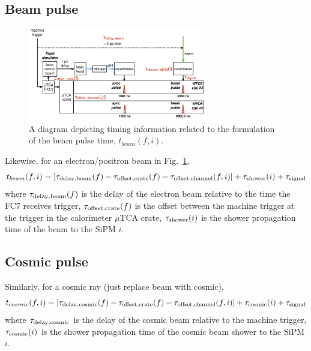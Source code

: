 \subsection{Beam pulse}

\begin{figure}[htbp]
\centering
\includegraphics[width=0.7\textwidth]{pics/BeamTimeFormulation.pdf} 
\caption{A diagram depicting timing information related to the formulation of the beam pulse time, $t_{beam}(f,i)$.}\label{fig:BeamTime}
\end{figure}

Likewise, for an electron/positron beam in Fig.~\ref{fig:BeamTime},
%
\begin{equation}
t_{beam}(f,i) = [\tau_{\rm{delay,beam}}(f) - \tau_{\rm{offset,crate}}(f) - \tau_{\rm{offset,channel}}(f,i) ]  + \tau_{\rm{shower}}(i) + \tau_{\rm{signal}} \label{eq:tbeam}
\end{equation}
%
where $\tau_{\rm{delay,beam}}(f)$ is the delay of the electron beam relative to the time the FC7 receives trigger, $\tau_{\rm{offset,crate}}(f)$ is the offset between the machine trigger at the trigger in the calorimeter $\mu$TCA crate, $\tau_{\rm{shower}}(i)$ is the shower propagation time of the beam to the SiPM $i$.

\subsection{Cosmic pulse}

Similarly, for a cosmic ray (just replace beam with cosmic),
%
\begin{equation}
t_{cosmic}(f,i) = [\tau_{\rm{delay,cosmic}}(f) - \tau_{\rm{offset,crate}}(f) - \tau_{\rm{offset,channel}}(f,i) ]  + \tau_{\rm{cosmic}}(i) + \tau_{\rm{signal}} \label{eq:tcosmic}
\end{equation}
%
where $\tau_{\rm{delay,cosmic}}$ is the delay of the cosmic beam relative to the machine trigger, $\tau_{\rm{cosmic}}(i)$ is the shower propagation time of the cosmic beam shower to the SiPM $i$.

